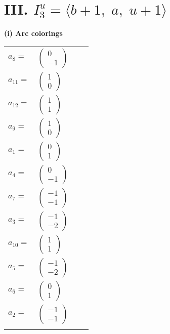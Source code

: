 \documentclass[1p]{elsarticle_modified}
\theoremstyle{definition}
\begin{document}
\centering \section*{III. $I^u_{3}= \langle b+1,\;a,\;u+1 \rangle$}
\flushleft \textbf{(i) Arc colorings}\\
\begin{tabular}{m{7pt} m{180pt} m{7pt} m{180pt} }
\flushright $a_{8}=$&$\begin{pmatrix}0\\-1\end{pmatrix}$ \\
\flushright $a_{11}=$&$\begin{pmatrix}1\\0\end{pmatrix}$ \\
\flushright $a_{12}=$&$\begin{pmatrix}1\\1\end{pmatrix}$ \\
\flushright $a_{9}=$&$\begin{pmatrix}1\\0\end{pmatrix}$ \\
\flushright $a_{1}=$&$\begin{pmatrix}0\\1\end{pmatrix}$ \\
\flushright $a_{4}=$&$\begin{pmatrix}0\\-1\end{pmatrix}$ \\
\flushright $a_{7}=$&$\begin{pmatrix}-1\\-1\end{pmatrix}$ \\
\flushright $a_{3}=$&$\begin{pmatrix}-1\\-2\end{pmatrix}$ \\
\flushright $a_{10}=$&$\begin{pmatrix}1\\1\end{pmatrix}$ \\
\flushright $a_{5}=$&$\begin{pmatrix}-1\\-2\end{pmatrix}$ \\
\flushright $a_{6}=$&$\begin{pmatrix}0\\1\end{pmatrix}$ \\
\flushright $a_{2}=$&$\begin{pmatrix}-1\\-1\end{pmatrix}$\\&\end{tabular}
\end{document}
